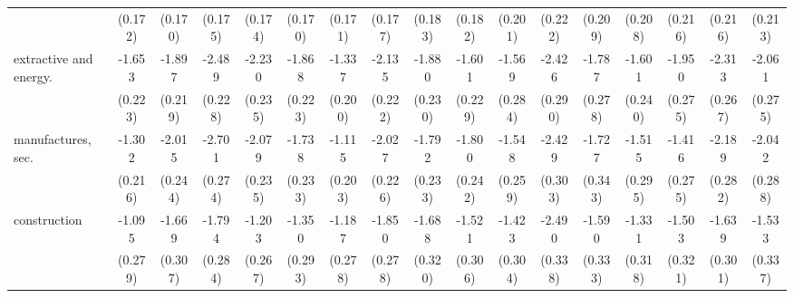 {\begin{tabular}{l*{16}{c}}
                    &     (0.172)         &     (0.170)         &     (0.175)         &     (0.174)         &     (0.170)         &     (0.171)         &     (0.177)         &     (0.183)         &     (0.182)         &     (0.201)         &     (0.222)         &     (0.209)         &     (0.208)         &     (0.216)         &     (0.216)         &     (0.213)         \\
[1em]
extractive and energy.&      -1.653\sym{***}&      -1.897\sym{***}&      -2.489\sym{***}&      -2.230\sym{***}&      -1.868\sym{***}&      -1.337\sym{***}&      -2.135\sym{***}&      -1.880\sym{***}&      -1.601\sym{***}&      -1.569\sym{***}&      -2.426\sym{***}&      -1.787\sym{***}&      -1.601\sym{***}&      -1.950\sym{***}&      -2.313\sym{***}&      -2.061\sym{***}\\
                    &     (0.223)         &     (0.219)         &     (0.228)         &     (0.235)         &     (0.223)         &     (0.200)         &     (0.222)         &     (0.230)         &     (0.229)         &     (0.284)         &     (0.290)         &     (0.278)         &     (0.240)         &     (0.275)         &     (0.267)         &     (0.275)         \\
[1em]
manufactures, sec.  &      -1.302\sym{***}&      -2.015\sym{***}&      -2.701\sym{***}&      -2.079\sym{***}&      -1.738\sym{***}&      -1.115\sym{***}&      -2.027\sym{***}&      -1.792\sym{***}&      -1.800\sym{***}&      -1.548\sym{***}&      -2.429\sym{***}&      -1.727\sym{***}&      -1.515\sym{***}&      -1.416\sym{***}&      -2.189\sym{***}&      -2.042\sym{***}\\
                    &     (0.216)         &     (0.244)         &     (0.274)         &     (0.235)         &     (0.233)         &     (0.203)         &     (0.226)         &     (0.233)         &     (0.242)         &     (0.259)         &     (0.303)         &     (0.343)         &     (0.295)         &     (0.275)         &     (0.282)         &     (0.288)         \\
[1em]
construction        &      -1.095\sym{***}&      -1.669\sym{***}&      -1.794\sym{***}&      -1.203\sym{***}&      -1.350\sym{***}&      -1.187\sym{***}&      -1.850\sym{***}&      -1.688\sym{***}&      -1.521\sym{***}&      -1.423\sym{***}&      -2.490\sym{***}&      -1.590\sym{***}&      -1.331\sym{***}&      -1.503\sym{***}&      -1.639\sym{***}&      -1.533\sym{***}\\
                    &     (0.279)         &     (0.307)         &     (0.284)         &     (0.267)         &     (0.293)         &     (0.278)         &     (0.278)         &     (0.320)         &     (0.306)         &     (0.304)         &     (0.338)         &     (0.333)         &     (0.318)         &     (0.321)         &     (0.301)         &     (0.337)         \\

\end{tabular}}
